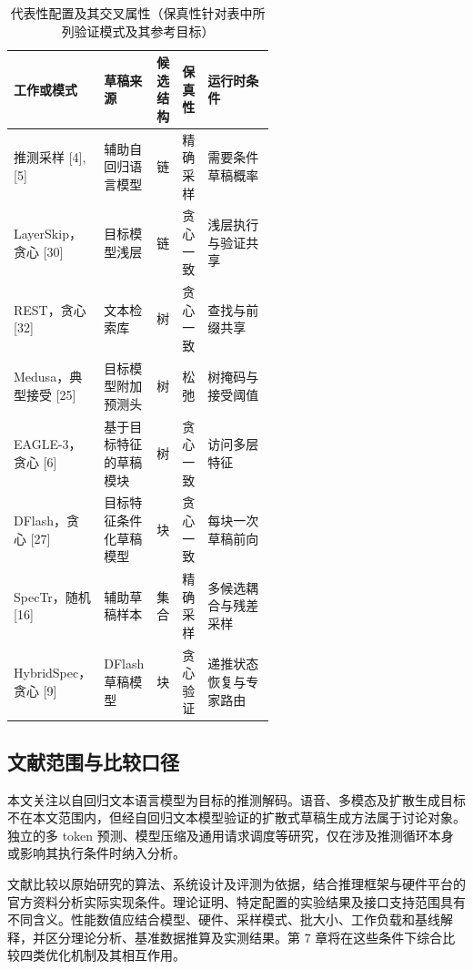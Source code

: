 \documentclass[11pt,a4paper,UTF8,fontset=none,scheme=plain,zihao=-4]{ctexart}
\begin{document}
\begin{table}[!tbp]
\centering
\footnotesize
\setlength{\tabcolsep}{3pt}
\renewcommand{\arraystretch}{1.22}
\caption{代表性配置及其交叉属性（保真性针对表中所列验证模式及其参考目标）}\label{tbl-methods}
\begin{tabularx}{\linewidth}{@{}>{\raggedright\arraybackslash}p{0.19\linewidth}>{\raggedright\arraybackslash}p{0.20\linewidth}>{\raggedright\arraybackslash}p{0.09\linewidth}>{\raggedright\arraybackslash}p{0.09\linewidth}>{\raggedright\arraybackslash}X@{}}
\toprule
\textbf{工作或模式} & \textbf{草稿来源} & \textbf{候选结构} & \textbf{保真性} & \textbf{运行时条件} \\
\midrule
推测采样 [4], [5] & 辅助自回归语言模型 & 链 & 精确采样 & 需要条件草稿概率 \\
\addlinespace[2pt]
LayerSkip，贪心 [30] & 目标模型浅层 & 链 & 贪心一致 & 浅层执行与验证共享 \\
\addlinespace[2pt]
REST，贪心 [32] & 文本检索库 & 树 & 贪心一致 & 查找与前缀共享 \\
\addlinespace[2pt]
Medusa，典型接受 [25] & 目标模型附加预测头 & 树 & 松弛 & 树掩码与接受阈值 \\
\addlinespace[2pt]
EAGLE-3，贪心 [6] & 基于目标特征的草稿模块 & 树 & 贪心一致 & 访问多层特征 \\
\addlinespace[2pt]
DFlash，贪心 [27] & 目标特征条件化草稿模型 & 块 & 贪心一致 & 每块一次草稿前向 \\
\addlinespace[2pt]
SpecTr，随机 [16] & 辅助草稿样本 & 集合 & 精确采样 & 多候选耦合与残差采样 \\
\addlinespace[2pt]
HybridSpec，贪心 [9] & DFlash 草稿模型 & 块 & 贪心验证 & 递推状态恢复与专家路由 \\
\bottomrule
\end{tabularx}
\end{table}

\hypertarget{section-2-4}{%
\subsection{文献范围与比较口径}\label{section-2-4}}

本文关注以自回归文本语言模型为目标的推测解码。语音、多模态及扩散生成目标不在本文范围内，但经自回归文本模型验证的扩散式草稿生成方法属于讨论对象。独立的多
token
预测、模型压缩及通用请求调度等研究，仅在涉及推测循环本身或影响其执行条件时纳入分析。

文献比较以原始研究的算法、系统设计及评测为依据，结合推理框架与硬件平台的官方资料分析实际实现条件。理论证明、特定配置的实验结果及接口支持范围具有不同含义。性能数值应结合模型、硬件、采样模式、批大小、工作负载和基线解释，并区分理论分析、基准数据推算及实测结果。第
7 章将在这些条件下综合比较四类优化机制及其相互作用。
\end{document}
